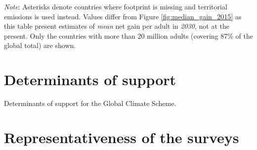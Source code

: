 \clearpage
{}
    {\footnotesize \textit{Note}: %
    Asterisks denote countries where footprint is missing and territorial emissions is used instead. %
    Values differ from Figure \ref{fig:median_gain_2015} as this table present estimates of \textit{mean} net gain per adult in \textit{2030}, not at the present. Only the countries with more than 20 million adults (covering 87\% of the global total) are shown. 
    }


\clearpage
\section{Determinants of support}\label{app:determinants}

\begin{table}[h]\label{tab:gcs_determinant}
    \caption[Determinants of support for the GCS]{Determinants of support for the Global Climate Scheme.} 
    \makebox[\textwidth][c]{
\resizebox*{!}{.73\textheight}{ %
        
        }
    }
    {\footnotesize %
    }
\end{table}


\clearpage
\section{Representativeness of the surveys}\label{app:representativeness}



